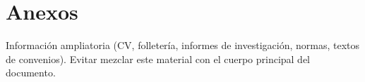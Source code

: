 \section*{Anexos}
Información ampliatoria (CV, folletería, informes de investigación, normas, textos de convenios).
Evitar mezclar este material con el cuerpo principal del documento.

